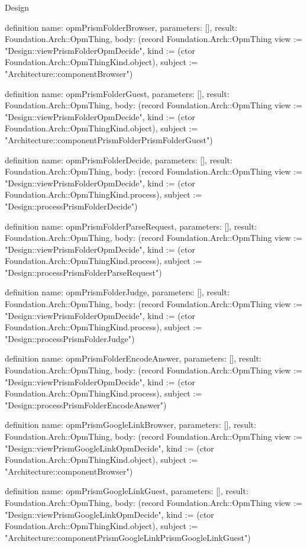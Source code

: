 \begin{lexlean}{Design}
\begin{semanticmodule}
definition{
  name: opmPrismFolderBrowser,
  parameters: [],
  result: Foundation.Arch::OpmThing,
  body: (record Foundation.Arch::OpmThing {view := "Design::viewPrismFolderOpmDecide", kind := (ctor Foundation.Arch::OpmThingKind.object), subject := "Architecture::componentBrowser"})
}

definition{
  name: opmPrismFolderGuest,
  parameters: [],
  result: Foundation.Arch::OpmThing,
  body: (record Foundation.Arch::OpmThing {view := "Design::viewPrismFolderOpmDecide", kind := (ctor Foundation.Arch::OpmThingKind.object), subject := "Architecture::componentPrismFolderPrismFolderGuest"})
}

definition{
  name: opmPrismFolderDecide,
  parameters: [],
  result: Foundation.Arch::OpmThing,
  body: (record Foundation.Arch::OpmThing {view := "Design::viewPrismFolderOpmDecide", kind := (ctor Foundation.Arch::OpmThingKind.process), subject := "Design::processPrismFolderDecide"})
}

definition{
  name: opmPrismFolderParseRequest,
  parameters: [],
  result: Foundation.Arch::OpmThing,
  body: (record Foundation.Arch::OpmThing {view := "Design::viewPrismFolderOpmDecide", kind := (ctor Foundation.Arch::OpmThingKind.process), subject := "Design::processPrismFolderParseRequest"})
}

definition{
  name: opmPrismFolderJudge,
  parameters: [],
  result: Foundation.Arch::OpmThing,
  body: (record Foundation.Arch::OpmThing {view := "Design::viewPrismFolderOpmDecide", kind := (ctor Foundation.Arch::OpmThingKind.process), subject := "Design::processPrismFolderJudge"})
}

definition{
  name: opmPrismFolderEncodeAnswer,
  parameters: [],
  result: Foundation.Arch::OpmThing,
  body: (record Foundation.Arch::OpmThing {view := "Design::viewPrismFolderOpmDecide", kind := (ctor Foundation.Arch::OpmThingKind.process), subject := "Design::processPrismFolderEncodeAnswer"})
}

definition{
  name: opmPrismGoogleLinkBrowser,
  parameters: [],
  result: Foundation.Arch::OpmThing,
  body: (record Foundation.Arch::OpmThing {view := "Design::viewPrismGoogleLinkOpmDecide", kind := (ctor Foundation.Arch::OpmThingKind.object), subject := "Architecture::componentBrowser"})
}

definition{
  name: opmPrismGoogleLinkGuest,
  parameters: [],
  result: Foundation.Arch::OpmThing,
  body: (record Foundation.Arch::OpmThing {view := "Design::viewPrismGoogleLinkOpmDecide", kind := (ctor Foundation.Arch::OpmThingKind.object), subject := "Architecture::componentPrismGoogleLinkPrismGoogleLinkGuest"})
}


\end{semanticmodule}
\end{lexlean}
